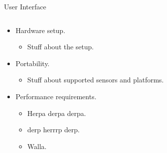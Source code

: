 \documentclass[final,hyperref={pdfpagelabels=false}]{beamer}
\begin{document}
\begin{frame}[t]
\begin{columns}[t]
\begin{column}{.465\textwidth}
\begin{block}{User Interface}
\begin{columns} %
\begin{column}{.54\textwidth} %
\begin{itemize}
\item Hardware setup.
\begin{itemize}
\item Stuff about the setup.
\end{itemize}
\item Portability.
\begin{itemize}
\item Stuff about supported sensors and platforms.
\end{itemize}
\end{itemize}

\begin{itemize}
\item Performance requirements.
\begin{itemize}
\item Herpa derpa derpa.
\item derp herrrp derp.
\item Walla.
\end{itemize}
\end{itemize}
\end{column}


\end{columns}
\end{block}
\end{column}
\end{columns}
\end{frame}
\end{document}
